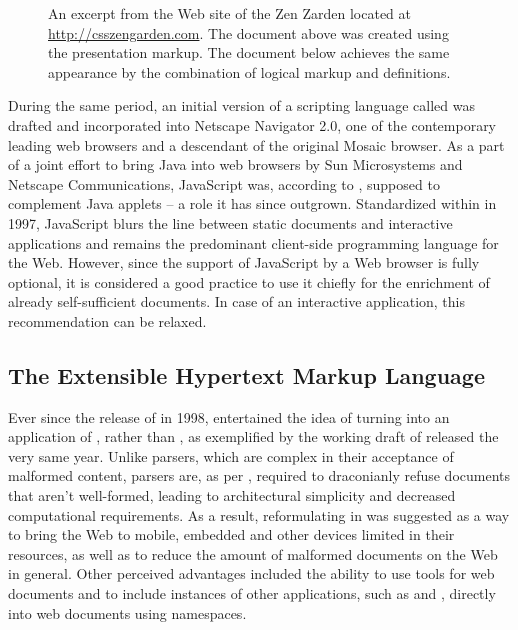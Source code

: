 \documentclass{book}
\begin{document}
\begin{figure}
  \inputminted{html}{examples/02/presentation-markup.html}
  \caption{An excerpt from the Web site of the  Zen Zarden
    located at \protect\url{http://csszengarden.com}. The document above was
    created using the  presentation markup. The document below
    achieves the same appearance by the combination of logical markup and
     definitions.}\bigskip
  \inputminted{html}{examples/02/logical-markup.html}
\end{figure}

During the same period, an initial version of a scripting language called
 was drafted and incorporated into Netscape Navigator 2.0, one
of the contemporary leading web browsers and a descendant of the original Mosaic
browser. As a part of a joint effort to bring Java into web browsers by Sun
Microsystems and Netscape Communications, JavaScript was, according to
\cite{js-announcement}, supposed to complement Java applets -- a role it has
since outgrown. Standardized within \cite{ecma1} in 1997, JavaScript blurs the
line between static documents and interactive applications and remains the
predominant client-side programming language for the Web.  However, since the
support of JavaScript by a Web browser is fully optional, it is considered a
good practice to use it chiefly for the enrichment of already self-sufficient
 documents. In case of an interactive application, this
recommendation can be relaxed.

\subsection{The Extensible Hypertext Markup Language}
Ever since the release of  in 1998,  entertained the
idea of turning  into an application of , rather than
, as exemplified by the working draft of \cite{raggett98} released
the very same year. Unlike  parsers, which are complex in their
acceptance of malformed content,  parsers are, as per
\cite[Section~1.2, Terminology]{bray98}, required to draconianly refuse
 documents that aren't well-formed, leading to architectural
simplicity and decreased computational requirements. As a result, reformulating
 in  was suggested as a way to bring the Web to
mobile, embedded and other devices limited in their resources, as well as to
reduce the amount of malformed documents on the Web in general. Other perceived
advantages included the ability to use  tools for web documents and
to include instances of other  applications, such as
 and , directly into web documents using
 namespaces.
\end{document}
